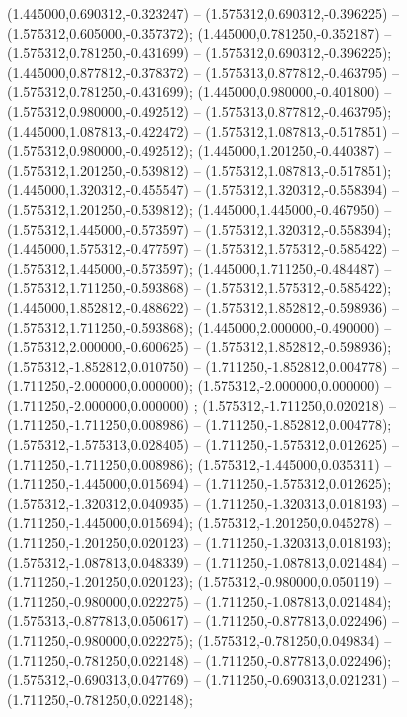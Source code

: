  (1.445000,0.690312,-0.323247) -- (1.575312,0.690312,-0.396225) -- (1.575312,0.605000,-0.357372);
 (1.445000,0.781250,-0.352187) -- (1.575312,0.781250,-0.431699) -- (1.575312,0.690312,-0.396225);
 (1.445000,0.877812,-0.378372) -- (1.575313,0.877812,-0.463795) -- (1.575312,0.781250,-0.431699);
 (1.445000,0.980000,-0.401800) -- (1.575312,0.980000,-0.492512) -- (1.575313,0.877812,-0.463795);
 (1.445000,1.087813,-0.422472) -- (1.575312,1.087813,-0.517851) -- (1.575312,0.980000,-0.492512);
 (1.445000,1.201250,-0.440387) -- (1.575312,1.201250,-0.539812) -- (1.575312,1.087813,-0.517851);
 (1.445000,1.320312,-0.455547) -- (1.575312,1.320312,-0.558394) -- (1.575312,1.201250,-0.539812);
 (1.445000,1.445000,-0.467950) -- (1.575312,1.445000,-0.573597) -- (1.575312,1.320312,-0.558394);
 (1.445000,1.575312,-0.477597) -- (1.575312,1.575312,-0.585422) -- (1.575312,1.445000,-0.573597);
 (1.445000,1.711250,-0.484487) -- (1.575312,1.711250,-0.593868) -- (1.575312,1.575312,-0.585422);
 (1.445000,1.852812,-0.488622) -- (1.575312,1.852812,-0.598936) -- (1.575312,1.711250,-0.593868);
 (1.445000,2.000000,-0.490000) -- (1.575312,2.000000,-0.600625) -- (1.575312,1.852812,-0.598936);
 (1.575312,-1.852812,0.010750) -- (1.711250,-1.852812,0.004778) -- (1.711250,-2.000000,0.000000);
 (1.575312,-2.000000,0.000000) -- (1.711250,-2.000000,0.000000) ;
 (1.575312,-1.711250,0.020218) -- (1.711250,-1.711250,0.008986) -- (1.711250,-1.852812,0.004778);
 (1.575312,-1.575313,0.028405) -- (1.711250,-1.575312,0.012625) -- (1.711250,-1.711250,0.008986);
 (1.575312,-1.445000,0.035311) -- (1.711250,-1.445000,0.015694) -- (1.711250,-1.575312,0.012625);
 (1.575312,-1.320312,0.040935) -- (1.711250,-1.320313,0.018193) -- (1.711250,-1.445000,0.015694);
 (1.575312,-1.201250,0.045278) -- (1.711250,-1.201250,0.020123) -- (1.711250,-1.320313,0.018193);
 (1.575312,-1.087813,0.048339) -- (1.711250,-1.087813,0.021484) -- (1.711250,-1.201250,0.020123);
 (1.575312,-0.980000,0.050119) -- (1.711250,-0.980000,0.022275) -- (1.711250,-1.087813,0.021484);
 (1.575313,-0.877813,0.050617) -- (1.711250,-0.877813,0.022496) -- (1.711250,-0.980000,0.022275);
 (1.575312,-0.781250,0.049834) -- (1.711250,-0.781250,0.022148) -- (1.711250,-0.877813,0.022496);
 (1.575312,-0.690313,0.047769) -- (1.711250,-0.690313,0.021231) -- (1.711250,-0.781250,0.022148);

